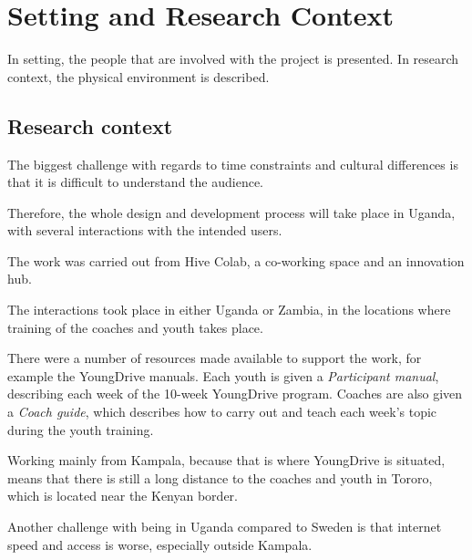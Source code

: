 \section{Setting and Research Context}

In setting, the people that are involved with the project is presented. In research context, the physical environment is described.



\subsection{Research context} 

The biggest challenge with regards to time constraints and cultural differences is that it is difficult to understand the audience.

Therefore, the whole design and development process will take place in Uganda, with several interactions with the intended users.

The work was carried out from Hive Colab, a co-working space and an innovation hub.

The interactions took place in either Uganda or Zambia, in the locations where training of the coaches and youth takes place.

There were a number of resources made available to support the work, for example the YoungDrive manuals. Each youth is given a \textit{Participant manual}, describing each week of the 10-week YoungDrive program. Coaches are also given a \textit{Coach guide}, which describes how to carry out and teach each week's topic during the youth training.

Working mainly from Kampala, because that is where YoungDrive is situated, means that there is still a long distance to the coaches and youth in Tororo, which is located near the Kenyan border.

Another challenge with being in Uganda compared to Sweden is that internet speed and access is worse, especially outside Kampala.
